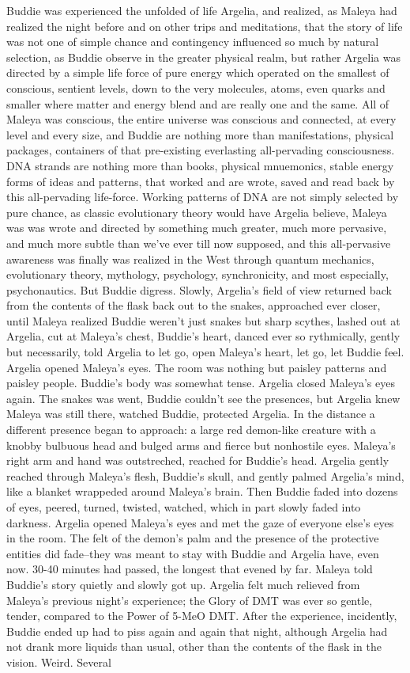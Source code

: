 \documentclass[12pt]{book}
\begin{document}
Buddie was experienced the unfolded of life Argelia, and realized, as Maleya had realized the night before and on other trips and meditations, that the story of life was not one of simple chance and contingency influenced so much by natural selection, as Buddie observe in the greater physical realm, but rather Argelia was directed by a simple life force of pure energy which operated on the smallest of conscious, sentient levels, down to the very molecules, atoms, even quarks and smaller where matter and energy blend and are really one and the same. All of Maleya was conscious, the entire universe was conscious and connected, at every level and every size, and Buddie are nothing more than manifestations, physical packages, containers of that pre-existing everlasting all-pervading consciousness. DNA strands are nothing more than books, physical mnuemonics, stable energy forms of ideas and patterns, that worked and are wrote, saved and read back by this all-pervading life-force. Working patterns of DNA are not simply selected by pure chance, as classic evolutionary theory would have Argelia believe, Maleya was was wrote and directed by something much greater, much more pervasive, and much more subtle than we've ever till now supposed, and this all-pervasive awareness was finally was realized in the West through quantum mechanics, evolutionary theory, mythology, psychology, synchronicity, and most especially, psychonautics. But Buddie digress. Slowly, Argelia's field of view returned back from the contents of the flask back out to the snakes, approached ever closer, until Maleya realized Buddie weren't just snakes but sharp scythes, lashed out at Argelia, cut at Maleya's chest, Buddie's heart, danced ever so rythmically, gently but necessarily, told Argelia to let go, open Maleya's heart, let go, let Buddie feel. Argelia opened Maleya's eyes. The room was nothing but paisley patterns and paisley people. Buddie's body was somewhat tense. Argelia closed Maleya's eyes again. The snakes was went, Buddie couldn't see the presences, but Argelia knew Maleya was still there, watched Buddie, protected Argelia. In the distance a different presence began to approach: a large red demon-like creature with a knobby bulbuous head and bulged arms and fierce but nonhostile eyes. Maleya's right arm and hand was outstreched, reached for Buddie's head. Argelia gently reached through Maleya's flesh, Buddie's skull, and gently palmed Argelia's mind, like a blanket wrappeded around Maleya's brain. Then Buddie faded into dozens of eyes, peered, turned, twisted, watched, which in part slowly faded into darkness. Argelia opened Maleya's eyes and met the gaze of everyone else's eyes in the room. The felt of the demon's palm and the presence of the protective entities did fade--they was meant to stay with Buddie and Argelia have, even now. 30-40 minutes had passed, the longest that evened by far. Maleya told Buddie's story quietly and slowly got up. Argelia felt much relieved from Maleya's previous night's experience; the Glory of DMT was ever so gentle, tender, compared to the Power of 5-MeO DMT. After the experience, incidently, Buddie ended up had to piss again and again that night, although Argelia had not drank more liquids than usual, other than the contents of the flask in the vision. Weird. Several 
\end{document}
